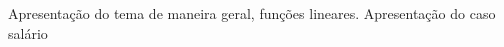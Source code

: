\documentclass{article}
\begin{document}
Apresentação do tema de maneira geral, funções lineares.
Apresentação do caso salário
\end{document}
